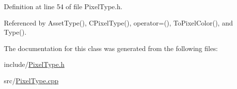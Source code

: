 Definition at line 54 of file Pixel\+Type.\+h.



Referenced by Asset\+Type(), C\+Pixel\+Type(), operator=(), To\+Pixel\+Color(), and Type().



The documentation for this class was generated from the following files\+:\begin{DoxyCompactItemize}
\item 
include/\hyperlink{PixelType_8h}{Pixel\+Type.\+h}\item 
src/\hyperlink{PixelType_8cpp}{Pixel\+Type.\+cpp}\end{DoxyCompactItemize}
